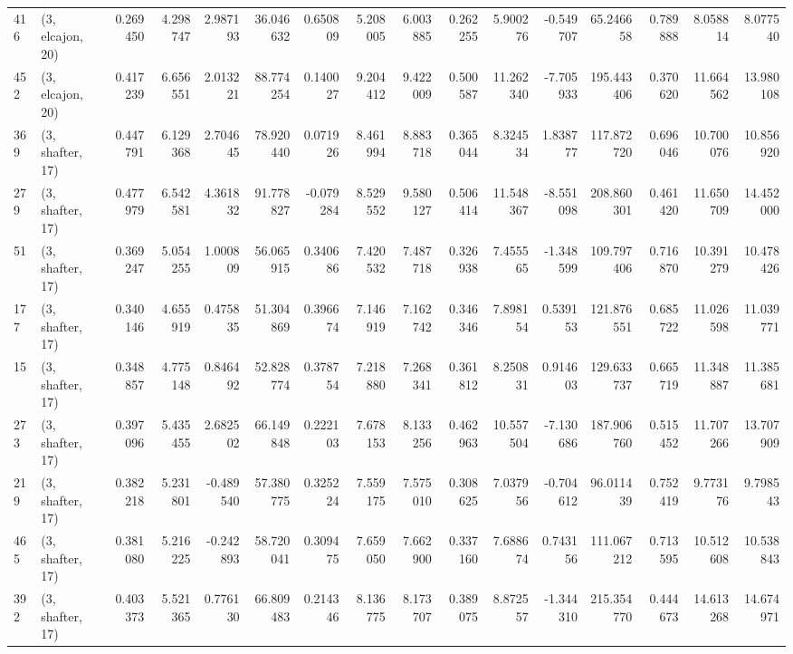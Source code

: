 \begin{tabular}{llrrrrrrrrrrrrrr}
416 &  (3, elcajon, 20) &   0.269450 &   4.298747 &   2.987193 &    36.046632 &   0.650809 &   5.208005 &   6.003885 &  0.262255 &   5.900276 &  -0.549707 &    65.246658 &  0.789888 &   8.058814 &   8.077540 \\
452 &  (3, elcajon, 20) &   0.417239 &   6.656551 &   2.013221 &    88.774254 &   0.140027 &   9.204412 &   9.422009 &  0.500587 &  11.262340 &  -7.705933 &   195.443406 &  0.370620 &  11.664562 &  13.980108 \\
369 &  (3, shafter, 17) &   0.447791 &   6.129368 &   2.704645 &    78.920440 &   0.071926 &   8.461994 &   8.883718 &  0.365044 &   8.324534 &   1.838777 &   117.872720 &  0.696046 &  10.700076 &  10.856920 \\
279 &  (3, shafter, 17) &   0.477979 &   6.542581 &   4.361832 &    91.778827 &  -0.079284 &   8.529552 &   9.580127 &  0.506414 &  11.548367 &  -8.551098 &   208.860301 &  0.461420 &  11.650709 &  14.452000 \\
51  &  (3, shafter, 17) &   0.369247 &   5.054255 &   1.000809 &    56.065915 &   0.340686 &   7.420532 &   7.487718 &  0.326938 &   7.455565 &  -1.348599 &   109.797406 &  0.716870 &  10.391279 &  10.478426 \\
177 &  (3, shafter, 17) &   0.340146 &   4.655919 &   0.475835 &    51.304869 &   0.396674 &   7.146919 &   7.162742 &  0.346346 &   7.898154 &   0.539153 &   121.876551 &  0.685722 &  11.026598 &  11.039771 \\
15  &  (3, shafter, 17) &   0.348857 &   4.775148 &   0.846492 &    52.828774 &   0.378754 &   7.218880 &   7.268341 &  0.361812 &   8.250831 &   0.914603 &   129.633737 &  0.665719 &  11.348887 &  11.385681 \\
273 &  (3, shafter, 17) &   0.397096 &   5.435455 &   2.682502 &    66.149848 &   0.222103 &   7.678153 &   8.133256 &  0.462963 &  10.557504 &  -7.130686 &   187.906760 &  0.515452 &  11.707266 &  13.707909 \\
219 &  (3, shafter, 17) &   0.382218 &   5.231801 &  -0.489540 &    57.380775 &   0.325224 &   7.559175 &   7.575010 &  0.308625 &   7.037956 &  -0.704612 &    96.011439 &  0.752419 &   9.773176 &   9.798543 \\
465 &  (3, shafter, 17) &   0.381080 &   5.216225 &  -0.242893 &    58.720041 &   0.309475 &   7.659050 &   7.662900 &  0.337160 &   7.688674 &   0.743156 &   111.067212 &  0.713595 &  10.512608 &  10.538843 \\
392 &  (3, shafter, 17) &   0.403373 &   5.521365 &   0.776130 &    66.809483 &   0.214346 &   8.136775 &   8.173707 &  0.389075 &   8.872557 &  -1.344310 &   215.354770 &  0.444673 &  14.613268 &  14.674971 \\

\end{tabular}
